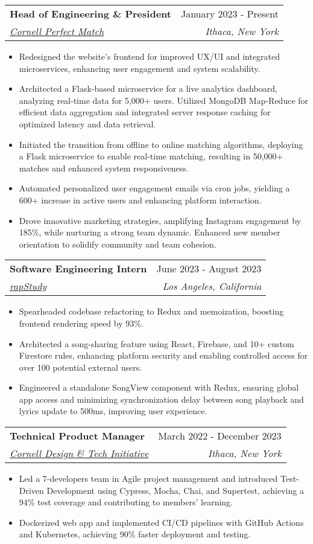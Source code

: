 \documentclass[letterpaper,10pt]{article}
\makeatletter
\newcommand{\resumeItem}[1]{
  \item\small{
    {#1 \vspace{-2pt}}
  }
}
\newcommand{\resumeSubheading}[4]{
  \vspace{-3pt}\item
    \begin{tabular*}{0.96\textwidth}[t]{@{}l@{\extracolsep{\fill}}r@{}}
      \textbf{#1} & #2 \\
      \textit{\small#3} & \textit{\small #4} \\
    \end{tabular*}\vspace{-7pt}
}
\newcommand{\resumeSubSubheading}[2]{
    \item
    \begin{tabular*}{0.97\textwidth}{l@{\extracolsep{\fill}}r}
      \textit{\small#1} & \textit{\small #2} \\
    \end{tabular*}\vspace{-7pt}
}
\newcommand{\resumeItemListStart}{\begin{itemize}}
\newcommand{\resumeItemListEnd}{\end{itemize}\vspace{-5.5pt}}
\makeatother
\begin{document}
    \resumeSubheading
      {Head of Engineering \& President}{January 2023 - Present}
      {\href{https://perfectmatch.ai/}{Cornell Perfect Match}}{Ithaca, New York}
      \resumeItemListStart
        \resumeItem{Redesigned the website's frontend for improved UX/UI and integrated microservices, enhancing user engagement and system scalability.}
        \resumeItem{Architected a Flask-based microservice for a live analytics dashboard, analyzing real-time data for 5,000+ users. Utilized MongoDB Map-Reduce for efficient data aggregation and integrated server response caching for optimized latency and data retrieval.}
        \resumeItem{Initiated the transition from offline to online matching algorithms, deploying a Flask microservice to enable real-time matching, resulting in 50,000+ matches and enhanced system responsiveness.}
        \resumeItem{Automated personalized user engagement emails via cron jobs, yielding a 600+ increase in active users and enhancing platform interaction.}
        \resumeItem{Drove innovative marketing strategies, amplifying Instagram engagement by 185\%, while nurturing a strong team dynamic. Enhanced new member orientation to solidify community and team cohesion.}

      \resumeItemListEnd

    \resumeSubheading{Software Engineering Intern}{June 2023 - August 2023}{\href{https://rapstudy.com/}{rapStudy}}{Los Angeles, California}
    \resumeItemListStart
        \resumeItem{Spearheaded codebase refactoring to Redux and memoization, boosting frontend rendering speed by 93\%.}
        \resumeItem{Architected a song-sharing feature using React, Firebase, and 10+ custom Firestore rules, enhancing platform security and enabling controlled access for over 100 potential external users.}
        \resumeItem{Engineered a standalone SongView component with Redux, ensuring global app access and minimizing synchronization delay between song playback and lyrics update to 500ms, improving user experience.}
    \resumeItemListEnd

      

    \resumeSubheading
      {Technical Product Manager}{March 2022 - December 2023}
      {\href{https://www.cornelldti.org/}{Cornell Design \& Tech Initiative}}{Ithaca, New York}
      \resumeItemListStart
        \resumeItem{Led a 7-developers team in Agile project management and introduced Test-Driven Development using Cypress, Mocha, Chai, and Supertest, achieving a 94\% test coverage and contributing to members' learning.}
        \resumeItem{Dockerized web app and implemented CI/CD pipelines with GitHub Actions and Kubernetes, achieving 90\% faster deployment and testing.}
    \resumeItemListEnd
\end{document}
